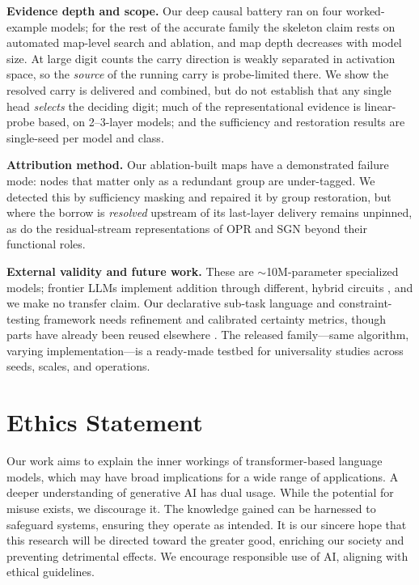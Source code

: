 \documentclass[11pt]{article}
\begin{document}
\textbf{Evidence depth and scope.} Our deep causal battery ran on four worked-example models; for the rest of the accurate family the skeleton claim rests on automated map-level search and ablation, and map depth decreases with model size. At large digit counts the carry direction is weakly separated in activation space, so the \emph{source} of the running carry is probe-limited there. We show the resolved carry is delivered and combined, but do not establish that any single head \emph{selects} the deciding digit; much of the representational evidence is linear-probe based, on 2--3-layer models; and the sufficiency and restoration results are single-seed per model and class.

\textbf{Attribution method.} Our ablation-built maps have a demonstrated failure mode: nodes that matter only as a redundant group are under-tagged. We detected this by sufficiency masking and repaired it by group restoration, but where the borrow is \emph{resolved} upstream of its last-layer delivery remains unpinned, as do the residual-stream representations of OPR and SGN beyond their functional roles.

\textbf{External validity and future work.} These are ${\sim}$10M-parameter specialized models; frontier LLMs implement addition through different, hybrid circuits \citep{lindsey2025biology}, and we make no transfer claim. Our declarative sub-task language and constraint-testing framework needs refinement and calibrated certainty metrics, though parts have already been reused elsewhere \citep{harrasse2025tinysqlprogressivetexttosqldataset}. The released family---same algorithm, varying implementation---is a ready-made testbed for universality studies across seeds, scales, and operations.

\section*{Ethics Statement}
\label{app:EthicsStatement}
Our work aims to explain the inner workings of transformer-based language models, which may have broad implications for a wide range of applications. 
A deeper understanding of generative AI has dual usage. While the potential for misuse exists, we discourage it. The knowledge gained can be harnessed 
to safeguard systems, ensuring they operate as intended. It is our sincere hope that this research will be directed toward the greater good, enriching 
our society and preventing detrimental effects. We encourage responsible use of AI, aligning with ethical guidelines.
\end{document}
